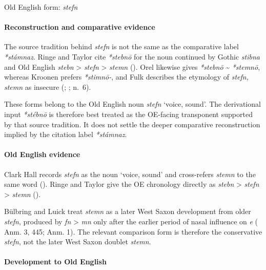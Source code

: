 \documentclass[
  british,
  a4paper,
]{article}
\begin{document}
Old English form: \emph{stefn}

\paragraph{Reconstruction and comparative
evidence}\label{reconstruction-and-comparative-evidence-28}

The source tradition behind \emph{stefn} is not the same as the
comparative label \emph{*stámnaz}. Ringe and Taylor cite \emph{*stebnō}
for the noun continued by Gothic \emph{stibna} and Old English
\emph{stebn} \textgreater{} \emph{stefn} \textgreater{} \emph{stemn}
(). Orel
likewise gives \emph{*stebnō} \textasciitilde{} \emph{*stemnō}, whereas
Kroonen prefers \emph{*stimnō-}, and Fulk describes the etymology of
\emph{stefn, stemn} as insecure (; ;
 n.~6).

These forms belong to the Old English noun \emph{stefn} `voice, sound'.
The derivational input \emph{*stébnō} is therefore best treated as the
OE-facing transponent supported by that source tradition. It does not
settle the deeper comparative reconstruction implied by the citation
label \emph{*stámnaz}.

\paragraph{Old English evidence}\label{old-english-evidence-28}

Clark Hall records \emph{stefn} as the noun `voice, sound' and
cross-refers \emph{stemn} to the same word
(). Ringe and Taylor
give the OE chronology directly as \emph{stebn} \textgreater{}
\emph{stefn} \textgreater{} \emph{stemn}
().

Bülbring and Luick treat \emph{stemn} as a later West Saxon development
from older \emph{stefn}, produced by \emph{fn} \textgreater{} \emph{mn}
only after the earlier period of nasal influence on \emph{e}
( Anm. 3, 445;
 Anm. 1). The
relevant comparison form is therefore the conservative \emph{stefn}, not
the later West Saxon doublet \emph{stemn}.

\paragraph{Development to Old
English}\label{development-to-old-english-28}
\end{document}
